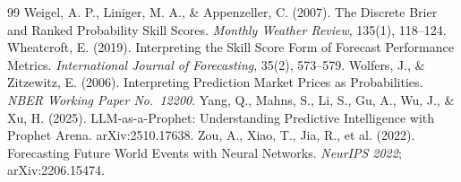 \documentclass[11pt]{article}
\begin{document}
\begin{thebibliography}{99}
 Weigel, A. P., Liniger, M. A., \& Appenzeller, C. (2007). The Discrete Brier and Ranked Probability Skill Scores. \emph{Monthly Weather Review}, 135(1), 118--124.
 Wheatcroft, E. (2019). Interpreting the Skill Score Form of Forecast Performance Metrics. \emph{International Journal of Forecasting}, 35(2), 573--579.
 Wolfers, J., \& Zitzewitz, E. (2006). Interpreting Prediction Market Prices as Probabilities. \emph{NBER Working Paper No.\ 12200}.
 Yang, Q., Mahns, S., Li, S., Gu, A., Wu, J., \& Xu, H. (2025). LLM-as-a-Prophet: Understanding Predictive Intelligence with Prophet Arena. arXiv:2510.17638.
 Zou, A., Xiao, T., Jia, R., et al. (2022). Forecasting Future World Events with Neural Networks. \emph{NeurIPS 2022}; arXiv:2206.15474.
\end{thebibliography}
\end{document}
